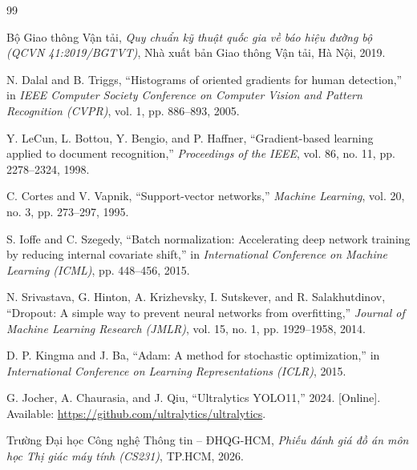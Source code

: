 \documentclass[a4paper, 11pt]{article}
\begin{document}
\newpage
\renewcommand{\refname}{Tài liệu tham khảo}
\begin{thebibliography}{99}

 Bộ Giao thông Vận tải, \emph{Quy chuẩn kỹ thuật quốc gia về báo hiệu đường bộ (QCVN 41:2019/BGTVT)}, Nhà xuất bản Giao thông Vận tải, Hà Nội, 2019.

 N. Dalal and B. Triggs, ``Histograms of oriented gradients for human detection,'' in \emph{IEEE Computer Society Conference on Computer Vision and Pattern Recognition (CVPR)}, vol. 1, pp. 886--893, 2005.

 Y. LeCun, L. Bottou, Y. Bengio, and P. Haffner, ``Gradient-based learning applied to document recognition,'' \emph{Proceedings of the IEEE}, vol. 86, no. 11, pp. 2278--2324, 1998.

 C. Cortes and V. Vapnik, ``Support-vector networks,'' \emph{Machine Learning}, vol. 20, no. 3, pp. 273--297, 1995.

 S. Ioffe and C. Szegedy, ``Batch normalization: Accelerating deep network training by reducing internal covariate shift,'' in \emph{International Conference on Machine Learning (ICML)}, pp. 448--456, 2015.

 N. Srivastava, G. Hinton, A. Krizhevsky, I. Sutskever, and R. Salakhutdinov, ``Dropout: A simple way to prevent neural networks from overfitting,'' \emph{Journal of Machine Learning Research (JMLR)}, vol. 15, no. 1, pp. 1929--1958, 2014.

 D. P. Kingma and J. Ba, ``Adam: A method for stochastic optimization,'' in \emph{International Conference on Learning Representations (ICLR)}, 2015.

 G. Jocher, A. Chaurasia, and J. Qiu, ``Ultralytics YOLO11,'' 2024. [Online]. Available: \url{https://github.com/ultralytics/ultralytics}.

 Trường Đại học Công nghệ Thông tin -- ĐHQG-HCM, \emph{Phiếu đánh giá đồ án môn học Thị giác máy tính (CS231)}, TP.HCM, 2026.

\end{thebibliography}
\end{document}
